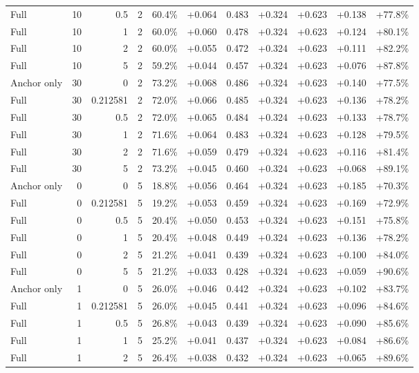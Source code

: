 \begin{table}[htbp]
\begin{tabular}{lrrrccccccc}
Full & 10 & 0.5 & 2 & 60.4\% & +0.064 & 0.483 & +0.324 & +0.623 & +0.138 & +77.8\% \\
Full & 10 & 1 & 2 & 60.0\% & +0.060 & 0.478 & +0.324 & +0.623 & +0.124 & +80.1\% \\
Full & 10 & 2 & 2 & 60.0\% & +0.055 & 0.472 & +0.324 & +0.623 & +0.111 & +82.2\% \\
Full & 10 & 5 & 2 & 59.2\% & +0.044 & 0.457 & +0.324 & +0.623 & +0.076 & +87.8\% \\
Anchor only & 30 & 0 & 2 & 73.2\% & +0.068 & 0.486 & +0.324 & +0.623 & +0.140 & +77.5\% \\
Full & 30 & 0.212581 & 2 & 72.0\% & +0.066 & 0.485 & +0.324 & +0.623 & +0.136 & +78.2\% \\
Full & 30 & 0.5 & 2 & 72.0\% & +0.065 & 0.484 & +0.324 & +0.623 & +0.133 & +78.7\% \\
Full & 30 & 1 & 2 & 71.6\% & +0.064 & 0.483 & +0.324 & +0.623 & +0.128 & +79.5\% \\
Full & 30 & 2 & 2 & 71.6\% & +0.059 & 0.479 & +0.324 & +0.623 & +0.116 & +81.4\% \\
Full & 30 & 5 & 2 & 73.2\% & +0.045 & 0.460 & +0.324 & +0.623 & +0.068 & +89.1\% \\
Anchor only & 0 & 0 & 5 & 18.8\% & +0.056 & 0.464 & +0.324 & +0.623 & +0.185 & +70.3\% \\
Full & 0 & 0.212581 & 5 & 19.2\% & +0.053 & 0.459 & +0.324 & +0.623 & +0.169 & +72.9\% \\
Full & 0 & 0.5 & 5 & 20.4\% & +0.050 & 0.453 & +0.324 & +0.623 & +0.151 & +75.8\% \\
Full & 0 & 1 & 5 & 20.4\% & +0.048 & 0.449 & +0.324 & +0.623 & +0.136 & +78.2\% \\
Full & 0 & 2 & 5 & 21.2\% & +0.041 & 0.439 & +0.324 & +0.623 & +0.100 & +84.0\% \\
Full & 0 & 5 & 5 & 21.2\% & +0.033 & 0.428 & +0.324 & +0.623 & +0.059 & +90.6\% \\
Anchor only & 1 & 0 & 5 & 26.0\% & +0.046 & 0.442 & +0.324 & +0.623 & +0.102 & +83.7\% \\
Full & 1 & 0.212581 & 5 & 26.0\% & +0.045 & 0.441 & +0.324 & +0.623 & +0.096 & +84.6\% \\
Full & 1 & 0.5 & 5 & 26.8\% & +0.043 & 0.439 & +0.324 & +0.623 & +0.090 & +85.6\% \\
Full & 1 & 1 & 5 & 25.2\% & +0.041 & 0.437 & +0.324 & +0.623 & +0.084 & +86.6\% \\
Full & 1 & 2 & 5 & 26.4\% & +0.038 & 0.432 & +0.324 & +0.623 & +0.065 & +89.6\% \\

\end{tabular}
\end{table}
